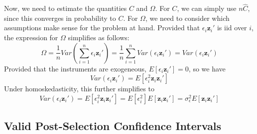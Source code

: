 \documentclass[12pt]{article}
\theoremstyle{definition}
\begin{document}
Now, we need to estimate the quantities $C$ and $\Omega$. For $C$, we can simply use $n\widehat{C}$, since this converges in probability to $C$. For $\Omega$, we need to consider which assumptions make sense for the problem at hand. Provided that  $\epsilon_i \mathbf{z}_i'$ is iid over $i$, the expression for $\Omega$ simplifies as follows:
$$\Omega = \frac{1}{n} Var \left( \sum_{i=1}^n \epsilon_i \textbf{z}_i'\right) = \frac{1}{n} \sum_{i=1}^n Var(\epsilon_i \textbf{z}_i') = Var(\epsilon_i \textbf{z}_i')$$
Provided that the instruments are exogeneous, $E[\epsilon_i \mathbf{z}_i'] = 0$, so we have
  $$Var(\epsilon_i \textbf{z}_i') = E[\epsilon_i^2 \textbf{z}_i\textbf{z}_i']$$
Under homoskedasticity, this further simplifies to
  $$Var(\epsilon_i \textbf{z}_i') = E[\epsilon_i^2 \textbf{z}_i\textbf{z}_i'] = E[\epsilon_i^2]E[\textbf{z}_i \textbf{z}_i'] = \sigma_\epsilon^2 E[\textbf{z}_i \textbf{z}_i']$$


\subsection{Valid Post-Selection Confidence Intervals}
\end{document}
